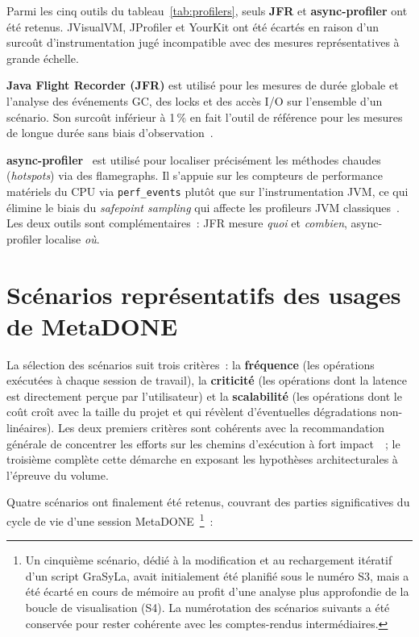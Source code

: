 Parmi les cinq outils du tableau~\ref{tab:profilers}, seuls \textbf{JFR} et \textbf{async-profiler} ont été retenus. JVisualVM, JProfiler et YourKit ont été écartés en raison d'un surcoût d'instrumentation jugé incompatible avec des mesures représentatives à grande échelle.

\textbf{Java Flight Recorder (JFR)} est utilisé pour les mesures de
durée globale et l'analyse des événements GC, des locks et des accès I/O
sur l'ensemble d'un scénario. Son surcoût inférieur à 1\,\% en fait
l'outil de référence pour les mesures de longue durée sans biais
d'observation~\cite{jfr2021oracle}.

\textbf{async-profiler}~\cite{asyncprofiler} est utilisé pour localiser précisément les
méthodes chaudes (\textit{hotspots}) via des flamegraphs. Il s'appuie sur
les compteurs de performance matériels du CPU via \texttt{perf\_events}
plutôt que sur l'instrumentation JVM, ce qui élimine le biais du
\textit{safepoint sampling} qui affecte les profileurs JVM classiques~\cite{mytkowicz2010evaluating}. Les deux outils sont complémentaires~: JFR mesure \textit{quoi} et \textit{combien}, async-profiler localise \textit{où}.

\section[Scénarios représentatifs]{Scénarios représentatifs des usages de MetaDONE}
\label{sec:scenarios}

La sélection des scénarios suit trois critères~: la \textbf{fréquence} (les
opérations exécutées à chaque session de travail), la \textbf{criticité}
(les opérations dont la latence est directement perçue par l'utilisateur)
et la \textbf{scalabilité} (les opérations dont le coût croît avec la
taille du projet et qui révèlent d'éventuelles dégradations non-linéaires).
Les deux premiers critères sont cohérents avec la recommandation générale
de concentrer les efforts sur les chemins d'exécution à fort
impact~\cite{oaks2014java}~; le troisième complète cette démarche en
exposant les hypothèses architecturales à l'épreuve du volume.

Quatre scénarios ont finalement été retenus, couvrant des parties significatives du cycle de vie d'une session MetaDONE~\footnote{Un cinquième scénario, dédié à la modification et au rechargement itératif d'un script GraSyLa, avait initialement été planifié sous le numéro S3, mais a été écarté en cours de mémoire au profit d'une analyse plus approfondie de la boucle de visualisation (S4). La numérotation des scénarios suivants a été conservée pour rester cohérente avec les comptes-rendus intermédiaires.}~:


